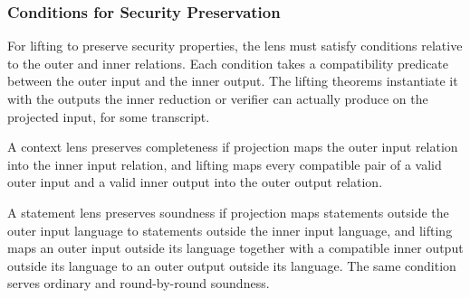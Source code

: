 \begin{definition}
    \label{def:reduction_lift_context}
    \leanok
\end{definition}

\subsubsection{Conditions for Security Preservation}

For lifting to preserve security properties, the lens must satisfy conditions relative to the
outer and inner relations. Each condition takes a compatibility predicate between the outer input
and the inner output. The lifting theorems instantiate it with the outputs the inner reduction or
verifier can actually produce on the projected input, for some transcript.

\begin{definition}
    \label{def:context_lens_is_complete}
    A context lens preserves completeness if projection maps the outer input relation into the
    inner input relation, and lifting maps every compatible pair of a valid outer input and a valid
    inner output into the outer output relation.
    \leanok
\end{definition}

\begin{definition}
    \label{def:statement_lens_is_sound}
    A statement lens preserves soundness if projection maps statements outside the outer input
    language to statements outside the inner input language, and lifting maps an outer input
    outside its language together with a compatible inner output outside its language to an outer
    output outside its language. The same condition serves ordinary and round-by-round soundness.
    \leanok
\end{definition}


